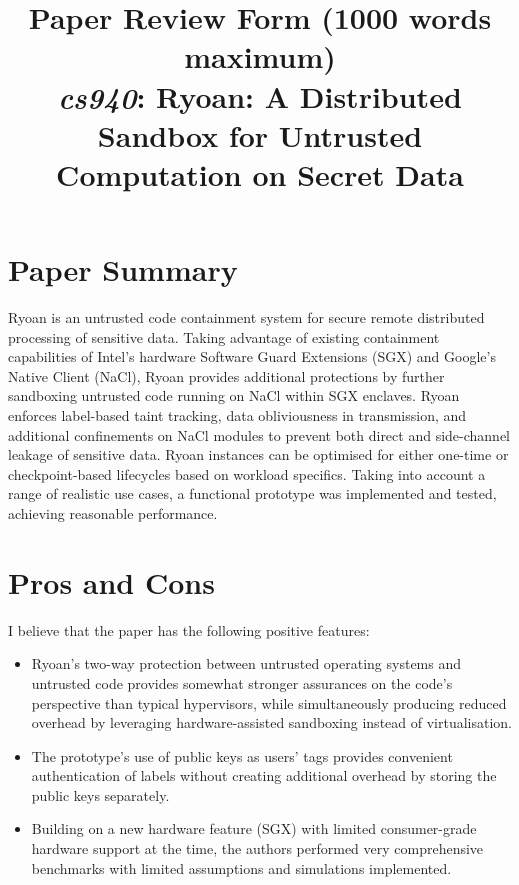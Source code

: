 \documentclass[11pt]{article}
\begin{document}
\title{Paper Review Form (1000 words maximum)\\
  \emph{cs940}: Ryoan: A Distributed Sandbox for Untrusted Computation on Secret Data \cite{hunt2016ryoan}}
\maketitle

\section*{Paper Summary}

Ryoan is an untrusted code containment system for secure remote distributed processing of sensitive data. Taking advantage of existing containment capabilities of Intel's hardware Software Guard Extensions (SGX) and Google's Native Client (NaCl), Ryoan provides additional protections by further sandboxing untrusted code running on NaCl within SGX enclaves. Ryoan enforces label-based taint tracking, data obliviousness in transmission, and additional confinements on NaCl modules to prevent both direct and side-channel leakage of sensitive data. Ryoan instances can be optimised for either one-time or checkpoint-based lifecycles based on workload specifics. Taking into account a range of realistic use cases, a functional prototype was implemented and tested, achieving reasonable performance.

\section*{Pros and Cons}

I believe that the paper has the following positive features:
\begin{itemize}
	\item Ryoan's two-way protection between untrusted operating systems and untrusted code provides somewhat stronger assurances on the code's perspective than typical hypervisors, while simultaneously producing reduced overhead by leveraging hardware-assisted sandboxing instead of virtualisation.
	\item The prototype's use of public keys as users' tags provides convenient authentication of labels without creating additional overhead by storing the public keys separately.
	\item Building on a new hardware feature (SGX) with limited consumer-grade hardware support at the time, the authors performed very comprehensive benchmarks with limited assumptions and simulations implemented.
\end{itemize}
\end{document}
